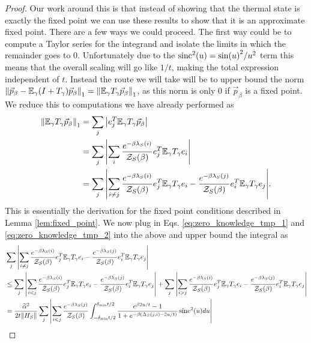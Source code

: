 \begin{proof}
    Our work around this is that instead of showing that the thermal state is exactly the fixed point we can use these results to show that it is an approximate fixed point. There are a few ways we could proceed. The first way could be to compute a Taylor series for the integrand and isolate the limits in which the remainder goes to 0. Unfortunately due to the $\operatorname{sinc}^2(u) = \sin(u)^2 / u^2$ term this means that the overall scaling will go like $1/t$, making the total expression independent of $t$. Instead the route we will take will be to upper bound the norm $\norm{\vec{p}_{\beta} - \mathbb{E}_\gamma (I + T_\gamma)\vec{p}_\beta}_1 = \norm{\mathbb{E}_\gamma T_\gamma \vec{p}_\beta}_1$, as this norm is only 0 if $\vec{p}_\beta$ is a fixed point. We reduce this to computations we have already performed as
    \begin{align}
        \norm{\mathbb{E}_\gamma T_\gamma \vec{p}_\beta}_1 &= \sum_j \abs{e_j^T \mathbb{E}_\gamma T_\gamma \vec{p}_\beta } \\
        &= \sum_j \abs{\sum_{i} \frac{e^{-\beta \lambda_S(i)}}{\mathcal{Z}_S(\beta)} e_j^T \mathbb{E}_\gamma T_\gamma e_i } \\
        &= \sum_j \abs{\sum_{i \neq j} \frac{e^{-\beta \lambda_S(i)}}{\mathcal{Z}_S(\beta)} e_j^T \mathbb{E}_\gamma T_\gamma e_i - \frac{e^{-\beta \lambda_S(j)}}{\mathcal{Z}_S(\beta)} e_i^T \mathbb{E}_\gamma T_\gamma e_j}.
    \end{align}
    This is essentially the derivation for the fixed point conditions described in Lemma \ref{lem:fixed_point}. We now plug in Eqs. \eqref{eq:zero_knowledge_tmp_1} and \eqref{eq:zero_knowledge_tmp_2} into the above and upper bound the integral as
    \begin{align}
        &\sum_j \abs{\sum_{i \neq j} \frac{e^{-\beta \lambda_S(i)}}{\partfun_S(\beta)} e_j^T \EE_\gamma T_\gamma e_i - \frac{e^{-\beta \lambda_S(j)}}{\partfun_S(\beta)} e_i^T \EE_\gamma T_\gamma e_j} \nonumber \\
        &\le \sum_j \abs{\sum_{i < j} \frac{e^{-\beta \lambda_S(i)}}{\partfun_S(\beta)} e_j^T \EE_\gamma T_\gamma e_i - \frac{e^{-\beta \lambda_S(j)}}{\partfun_S(\beta)} e_i^T \EE_\gamma T_\gamma e_j} + \sum_j  \abs{\sum_{i > j} \frac{e^{-\beta \lambda_S(i)}}{\partfun_S(\beta)} e_j^T \EE_\gamma T_\gamma e_i - \frac{e^{-\beta \lambda_S(j)}}{\partfun_S(\beta)} e_i^T \EE_\gamma T_\gamma e_j} \\
        &= \frac{\widetilde{\alpha}^2}{2 t \norm{H_S}} \sum_j \abs{\sum_{i < j} \frac{e^{-\beta \lambda_S(j)}}{\partfun_S(\beta)} \int_{-\delta_{\min} t /2 }^{\delta_{\min} t/ 2} \frac{ e^{\beta 2 u / t} - 1}{1 + e^{-\beta(\Delta_S(j, i) - 2u/t)}} \sinc^2(u) du} \nonumber \\

\end{align}
\end{proof}
